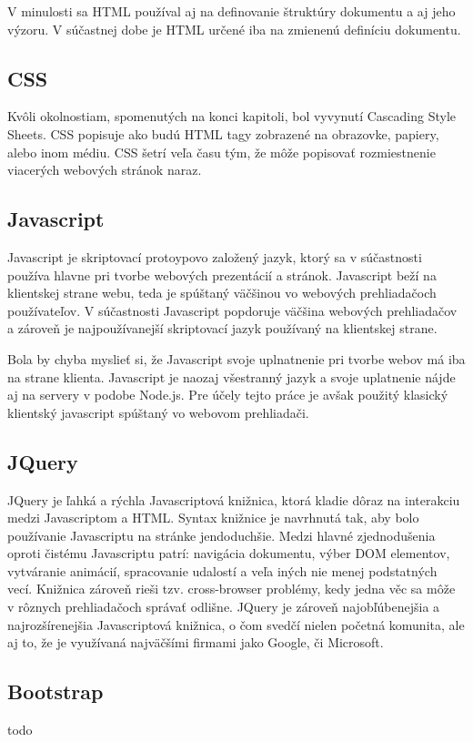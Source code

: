 V minulosti sa HTML používal aj na definovanie štruktúry dokumentu a aj jeho výzoru. V súčastnej dobe je HTML určené iba na zmienenú definíciu dokumentu.

\subsection{CSS}
Kvôli okolnostiam, spomenutých na konci kapitoli, bol vyvynutí Cascading Style Sheets. CSS popisuje ako budú HTML tagy zobrazené na obrazovke, papiery, alebo inom médiu. CSS šetrí veľa času tým, že môže popisovať rozmiestnenie viacerých webových stránok naraz.

\subsection{Javascript}
Javascript je skriptovací protoypovo založený jazyk, ktorý sa v súčastnosti používa hlavne pri tvorbe webových prezentácií a stránok. Javascript beží na klientskej strane webu, teda je spúštaný väčšinou vo webových prehliadačoch používateľov. V súčastnosti Javascript popdoruje väčšina webových prehliadačov a zároveň je najpoužívanejší skriptovací jazyk používaný na klientskej strane.

Bola by chyba myslieť si, že Javascript svoje uplnatnenie pri tvorbe webov má iba na strane klienta. Javascript je naozaj všestranný jazyk a svoje uplatnenie nájde aj na servery v podobe Node.js. Pre účely tejto práce je avšak použitý klasický klientský javascript spúštaný vo webovom prehliadači.


\subsection{JQuery}
JQuery je ľahká a rýchla Javascriptová knižnica, ktorá kladie dôraz na interakciu medzi Javascriptom a HTML. Syntax knižnice je navrhnutá tak, aby bolo používanie Javascriptu na stránke jendoduchšie. Medzi hlavné zjednodušenia oproti čistému Javascriptu patrí: navigácia dokumentu, výber DOM elementov, vytváranie animácií, spracovanie udalostí a veľa iných nie menej podstatných vecí. Knižnica zároveň rieši tzv. cross-browser problémy, kedy jedna věc sa môže v rôznych prehliadačoch správať odlišne.
JQuery je zároveň najobľúbenejšia a najrozšírenejšia Javascriptová knižnica, o čom svedčí nielen početná komunita, ale aj to, že je využívaná najväčšími firmami jako Google, či Microsoft.


\subsection{Bootstrap}
todo

